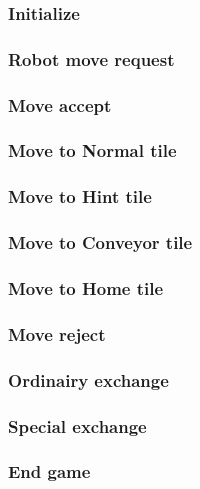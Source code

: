 	\subsubsection{Initialize}
    	
    	
	\subsubsection{Robot move request}
	
	
	\subsubsection{Move accept}
	

	\subsubsection{Move to Normal tile}
	

	\subsubsection{Move to Hint tile}
	

	\subsubsection{Move to Conveyor tile}
	

	\subsubsection{Move to Home tile}
	


	\subsubsection{Move reject}
	


	\subsubsection{Ordinairy exchange}
	
	
	\subsubsection{Special exchange}
	
	
	\subsubsection{End game}
	
